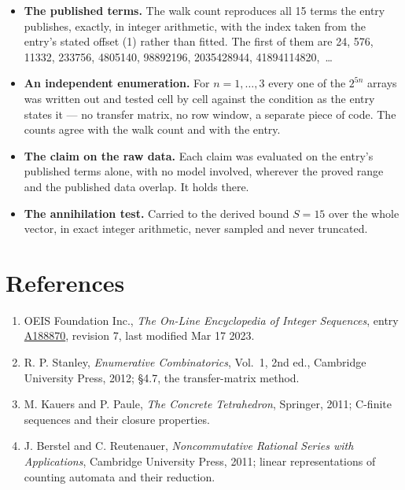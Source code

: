 \documentclass[11pt]{article}
\theoremstyle{definition}
\begin{document}
\begin{itemize}

\item {\bfseries The published terms.} The walk count reproduces all 15 terms the entry publishes, exactly, in integer arithmetic, with the index taken from the entry's stated offset (1) rather than fitted. The first of them are 24, 576, 11332, 233756, 4805140, 98892196, 2035428944, 41894114820,~\dots

\item {\bfseries An independent enumeration.} For $n = 1,\dots,3$ every one of the $2^{5n}$ arrays was written out and tested cell by cell against the condition as the entry states it --- no transfer matrix, no row window, a separate piece of code. The counts agree with the walk count and with the entry.

\item {\bfseries The claim on the raw data.} Each claim was evaluated on the entry's published terms alone, with no model involved, wherever the proved range and the published data overlap. It holds there.

\item {\bfseries The annihilation test.} Carried to the derived bound $S = 15$ over the whole vector, in exact integer arithmetic, never sampled and never truncated.

\end{itemize}

\section{References}

\begin{enumerate}

\item OEIS Foundation Inc., \emph{The On-Line Encyclopedia of Integer Sequences}, entry \href{https://oeis.org/A188870}{A188870}, revision 7, last modified Mar 17 2023.

\item R. P. Stanley, \emph{Enumerative Combinatorics}, Vol.~1, 2nd ed., Cambridge University Press, 2012; \S4.7, the transfer-matrix method.

\item M. Kauers and P. Paule, \emph{The Concrete Tetrahedron}, Springer, 2011; C-finite sequences and their closure properties.

\item J. Berstel and C. Reutenauer, \emph{Noncommutative Rational Series with Applications}, Cambridge University Press, 2011; linear representations of counting automata and their reduction.

\end{enumerate}
\end{document}
